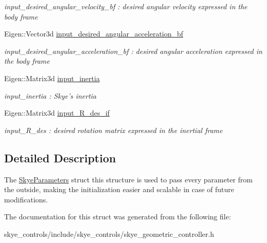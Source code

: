 \begin{DoxyCompactItemize}
\begin{DoxyCompactList}\small\item\em input\-\_\-desired\-\_\-angular\-\_\-velocity\-\_\-bf \-: desired angular velocity expressed in the body frame \end{DoxyCompactList}\item 
\hypertarget{struct_skye_parameters_af0ea0ec407eaef0ddec28e96ab098d1c}{Eigen\-::\-Vector3d \hyperlink{struct_skye_parameters_af0ea0ec407eaef0ddec28e96ab098d1c}{input\-\_\-desired\-\_\-angular\-\_\-acceleration\-\_\-bf}}\label{struct_skye_parameters_af0ea0ec407eaef0ddec28e96ab098d1c}

\begin{DoxyCompactList}\small\item\em input\-\_\-desired\-\_\-angular\-\_\-acceleration\-\_\-bf \-: desired angular acceleration expressed in the body frame \end{DoxyCompactList}\item 
\hypertarget{struct_skye_parameters_a008add5ffc2700bd3af1caec5411af1d}{Eigen\-::\-Matrix3d \hyperlink{struct_skye_parameters_a008add5ffc2700bd3af1caec5411af1d}{input\-\_\-inertia}}\label{struct_skye_parameters_a008add5ffc2700bd3af1caec5411af1d}

\begin{DoxyCompactList}\small\item\em input\-\_\-inertia \-: Skye's inertia \end{DoxyCompactList}\item 
\hypertarget{struct_skye_parameters_acc2c9df1cdc2feb5695ae3dc49c7b838}{Eigen\-::\-Matrix3d \hyperlink{struct_skye_parameters_acc2c9df1cdc2feb5695ae3dc49c7b838}{input\-\_\-\-R\-\_\-des\-\_\-if}}\label{struct_skye_parameters_acc2c9df1cdc2feb5695ae3dc49c7b838}

\begin{DoxyCompactList}\small\item\em input\-\_\-\-R\-\_\-des \-: desired rotation matrix expressed in the inertial frame \end{DoxyCompactList}\end{DoxyCompactItemize}


\subsection{Detailed Description}
The \hyperlink{struct_skye_parameters}{Skye\-Parameters} struct this structure is used to pass every parameter from the outside, making the initialization easier and scalable in case of future modifications. 

The documentation for this struct was generated from the following file\-:\begin{DoxyCompactItemize}
\item 
skye\-\_\-controls/include/skye\-\_\-controls/skye\-\_\-geometric\-\_\-controller.\-h\end{DoxyCompactItemize}
